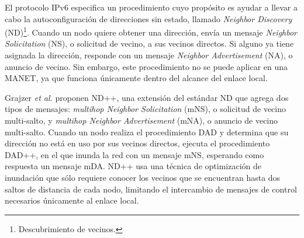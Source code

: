 El protocolo IPv6 especifica un procedimiento cuyo propósito es ayudar a
llevar a cabo la autoconfiguración de direcciones sin estado, llamado
\textit{Neighbor Discovery} (ND)\footnote{Descubrimiento de vecinos.}. Cuando un
nodo quiere obtener una dirección, envía un mensaje \textit{Neighbor Solicitation}
(NS), o solicitud de vecino, a sus vecinos directos. Si alguno ya tiene asignada
la dirección, responde con un mensaje \textit{Neighbor Advertisement} (NA), o
anuncio de vecino. Sin embargo, este procedimiento no se puede aplicar en una
MANET, ya que funciona únicamente dentro del alcance del enlace local.

Grajzer \textit{et al.} \cite{Grajzer2019} proponen ND++, una extensión del
estándar ND que agrega dos tipos de mensajes: \textit{multihop Neighbor
Solicitation} (mNS), o solicitud de vecino multi-salto, y \textit{multihop
Neighbor Advertisement} (mNA), o anuncio de vecino multi-salto. Cuando un nodo
realiza el procedimiento DAD y determina que su dirección no está en uso por
sus vecinos directos, ejecuta el procedimiento DAD++, en el que inunda la red
con un mensaje mNS, esperando como respuesta un mensaje mDA. ND++ usa una
técnica de optimización de inundación que sólo requiere conocer los vecinos que
se encuentran hasta dos saltos de distancia de cada nodo, limitando el
intercambio de mensajes de control necesarios únicamente al enlace local.
